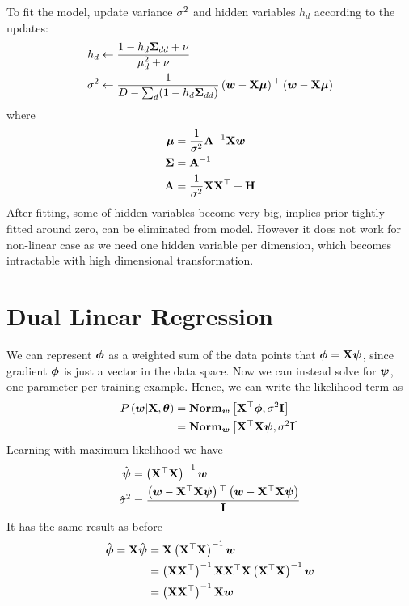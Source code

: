 To fit the model, update variance $\sigma^2$ and hidden variables $h_d$ according to the updates:
\begin{align*}
	h_d&\gets\frac{1-h_d\mathbf{\Sigma}_{dd}+\nu}{\mu_d^2+\nu} \\
	\sigma^2&\gets\frac{1}{D-\sum_d(1-h_d\mathbf{\Sigma}_{dd})}\left(\boldsymbol{w}-\mathbf{X}\boldsymbol{\mu}\right){}^\top\left(\boldsymbol{w}-\mathbf{X}\boldsymbol{\mu}\right)
\end{align*}
where
\begin{align*}
	\boldsymbol{\mu}&=\frac{1}{\sigma^2}\mathbf{A}^{-1}\mathbf{X}\boldsymbol{w} \\
	\mathbf{\Sigma}&=\mathbf{A}^{-1} \\
	\mathbf{A}&=\frac{1}{\sigma^2}\mathbf{X}\mathbf{X}^\top+\mathbf{H}
\end{align*}
After fitting, some of hidden variables become very big, implies prior tightly fitted around zero, can be eliminated from model. However it does not work for non-linear case as we need one hidden variable per dimension, which becomes intractable with high dimensional transformation.



\section{Dual Linear Regression}
\label{section6.7}

We can represent $\boldsymbol{\phi}$ as a weighted sum of the data points that $\boldsymbol{\phi}=\mathbf{X}\boldsymbol{\psi}$, since gradient $\boldsymbol{\phi}$ is just a vector in the data space. Now we can instead solve for $\boldsymbol{\psi}$, one parameter per training example. Hence, we can write the likelihood term as
\begin{align*}
	P\left(\boldsymbol{w}|\mathbf{X},\boldsymbol{\theta}\right)&=\mathbf{Norm}_{\boldsymbol{w}}\left[\mathbf{X}{}^\top\boldsymbol{\phi},\sigma^2\mathbf{I}\right] \\
	&=\mathbf{Norm}_{\boldsymbol{w}}\left[\mathbf{X}{}^\top\mathbf{X}\boldsymbol{\psi},\sigma^2\mathbf{I}\right]
\end{align*}
Learning with maximum likelihood we have
\begin{align*}
	\hat{\boldsymbol{\psi}}&=\left(\mathbf{X}^\top\mathbf{X}\right)^{-1}\boldsymbol{w} \\
	\hat{\sigma}^2&=\frac{\left(\boldsymbol{w}-\mathbf{X}^\top\mathbf{X}\boldsymbol{\psi}\right){}^\top\left(\boldsymbol{w}-\mathbf{X}^\top\mathbf{X}\boldsymbol{\psi}\right)}{\mathbf{I}}
\end{align*}
It has the same result as before
\begin{align*}
	\hat{\boldsymbol{\phi}}=\mathbf{X}\hat{\boldsymbol{\psi}}&=\mathbf{X}\left(\mathbf{X}^\top\mathbf{X}\right)^{-1}\boldsymbol{w} \\
	&=\left(\mathbf{X}\mathbf{X}^\top\right)^{-1}\mathbf{X}\mathbf{X}^\top\mathbf{X}\left(\mathbf{X}^\top\mathbf{X}\right)^{-1}\boldsymbol{w} \\
	&=\left(\mathbf{X}\mathbf{X}^\top\right)^{-1}\mathbf{X}\boldsymbol{w}
\end{align*}


